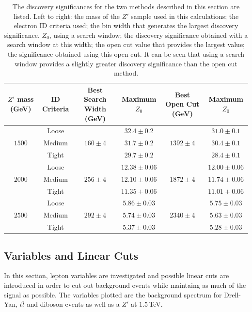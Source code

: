 \documentclass{article}
\begin{document}
\begin{table}[h!t]
\label{table:discoverySignificance}
\centering
\caption{The discovery significances for the two methods described in this section are listed. Left to right: the mass of the $Z'$ sample used in this calculations; the electron ID criteria used; the bin width that generates the largest discovery significance, $Z_0$, using a search window; the discovery significance obtained with a search window at this width; the open cut value that provides the largest value; the significance obtained using this open cut. It can be seen that using a search window provides a slightly greater discovery significance than the open cut method.}
\begin{tabular}{ |c|c|c|c|c|c| } 
\hline
$Z'$ mass (GeV) &  ID Criteria & Best Search Width (GeV) & Maximum $Z_0$ & Best Open Cut (GeV) &Maximum $Z_0$\\
\hline
\multirow{3}{*}{$1500$}  & Loose & \multirow{3}{*}{$160\pm4$}& $32.4\pm0.2$ & \multirow{3}{*}{$1392\pm4$} &$31.0\pm0.1$ \\\cline{2-2}\cline{4-4}\cline{6-6}
& Medium  & & $31.7\pm0.2$ & & $30.4\pm0.1$\\\cline{2-2}\cline{4-4}\cline{6-6}
& Tight &  & $29.7\pm0.2$ & & $28.4\pm0.1$\\\hline
\multirow{3}{*}{$2000$} & Loose & \multirow{3}{*}{$256\pm4$}& $12.38\pm0.06$ & \multirow{3}{*}{$1872\pm4$} & $12.00\pm0.06$\\\cline{2-2}\cline{4-4}\cline{6-6}
&  Medium & & $12.10\pm0.06$ & & $11.74\pm0.06$ \\\cline{2-2}\cline{4-4}\cline{6-6}
&  Tight & & $11.35\pm0.06$ & & $11.01\pm0.06$\\\hline
\multirow{3}{*}{$2500$} &  Loose & \multirow{3}{*}{$292\pm4$}& $5.86\pm0.03$ & \multirow{3}{*}{$2340\pm4$} & $5.75\pm0.03$ \\\cline{2-2}\cline{4-4}\cline{6-6}
&  Medium & & $5.74\pm0.03$ & & $5.63\pm0.03$\\\cline{2-2}\cline{4-4}\cline{6-6}
&  Tight  & & $5.37\pm0.03$ & & $5.28\pm0.03$\\\hline
\end{tabular}
\end{table}

\subsection{Variables and Linear Cuts}

In this section, lepton variables are investigated and possible linear cuts are introduced in order to cut out background events while maintaing as much of the signal as possible. The variables plotted are the background spectrum for Drell-Yan, $t\overline{t}$ and diboson events as well as a $Z'$ at $1.5\,$TeV.
\end{document}
